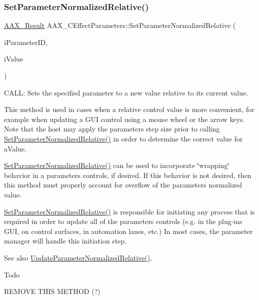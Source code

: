 \subsubsection{\texorpdfstring{SetParameterNormalizedRelative()}{SetParameterNormalizedRelative()}}
{\footnotesize\ttfamily \mbox{\hyperlink{a00392_a4d8f69a697df7f70c3a8e9b8ee130d2f}{A\+A\+X\+\_\+\+Result}} A\+A\+X\+\_\+\+C\+Effect\+Parameters\+::\+Set\+Parameter\+Normalized\+Relative (\begin{DoxyParamCaption}\item[{\mbox{\hyperlink{a00392_a1440c756fe5cb158b78193b2fc1780d1}{A\+A\+X\+\_\+\+C\+Param\+ID}}}]{i\+Parameter\+ID,  }\item[{double}]{i\+Value }\end{DoxyParamCaption})\hspace{0.3cm}{\ttfamily [virtual]}}



C\+A\+LL\+: Sets the specified parameter to a new value relative to its current value. 

This method is used in cases when a relative control value is more convenient, for example when updating a G\+UI control using a mouse wheel or the arrow keys. Note that the host may apply the parameter\textquotesingle{}s step size prior to calling \mbox{\hyperlink{a01481_a2191024666f779ea95e89e03fc76a7a8}{Set\+Parameter\+Normalized\+Relative()}} in order to determine the correct value for a\+Value.

\mbox{\hyperlink{a01481_a2191024666f779ea95e89e03fc76a7a8}{Set\+Parameter\+Normalized\+Relative()}} can be used to incorporate \char`\"{}wrapping\char`\"{} behavior in a parameter\textquotesingle{}s controls, if desired. If this behavior is not desired, then this method must properly account for overflow of the parameter\textquotesingle{}s normalized value.

\mbox{\hyperlink{a01481_a2191024666f779ea95e89e03fc76a7a8}{Set\+Parameter\+Normalized\+Relative()}} is responsible for initiating any process that is required in order to update all of the parameter\textquotesingle{}s controls (e.\+g. in the plug-\/in\textquotesingle{}s G\+UI, on control surfaces, in automation lanes, etc.) In most cases, the parameter manager will handle this initiation step.

See also \mbox{\hyperlink{a01481_aa2e14fdf26352f16f3b0c437bc0894cb}{Update\+Parameter\+Normalized\+Relative()}}.

\begin{DoxyRefDesc}{Todo}
\item[\mbox{\hyperlink{a00785__todo000039}{Todo}}]R\+E\+M\+O\+VE T\+H\+IS M\+E\+T\+H\+OD (?)\end{DoxyRefDesc}



